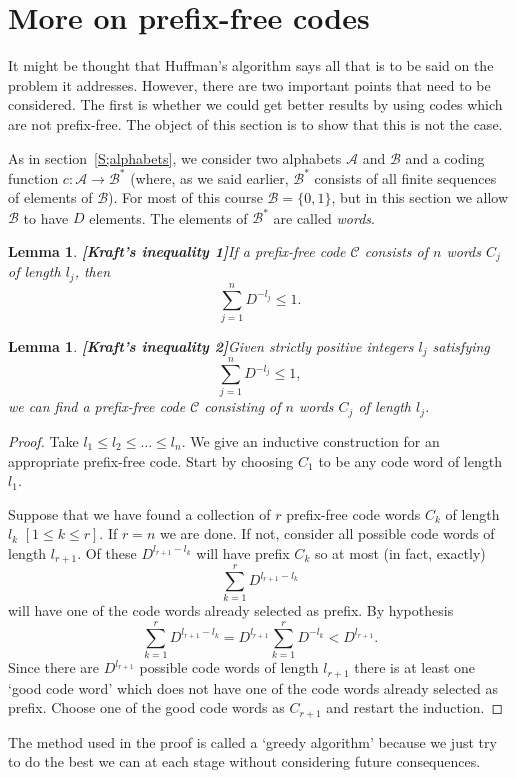 \documentclass[12pt,a4paper]{article}
\theoremstyle{plain}
\newtheorem{lemma}[theorem]{Lemma}
\theoremstyle{definition}
\begin{document}
\section{More on prefix-free codes}\label{S;prefix} 
It might be thought that
Huffman's algorithm says all that is to be said on
the problem it addresses. However, there are two important
points that need to be considered. The first is whether
we could get better results by using codes which
are not prefix-free. The object of this section is
to show that this is not the case.

As in section~\ref{S;alphabets},
we consider two alphabets ${\mathcal A}$
and ${\mathcal B}$ 
and a coding function $c:{\mathcal A}\rightarrow{\mathcal B}^{*}$
(where, as we said earlier, 
${\mathcal B}^{*}$ consists of all finite sequences of 
elements of  ${\mathcal B}$).  For most of this
course ${\mathcal B}=\{0,1\}$, but in this section
we allow ${\mathcal B}$ to have $D$ elements.
The elements of ${\mathcal B}^{*}$ are called \emph{words}.

\begin{lemma} {\bf [Kraft's inequality 1]}\label{Kraft 1}
If a prefix-free code ${\mathcal C}$ consists
of $n$ words $C_{j}$ of length $l_{j}$, then
\[\sum_{j=1}^{n}D^{-l_{j}}\leq 1.\]
\end{lemma}
\begin{lemma} {\bf [Kraft's inequality 2]}\label{L;Kraft 2}
Given strictly positive integers $l_{j}$ satisfying
\[\sum_{j=1}^{n}D^{-l_{j}}\leq 1,\]
we can find a prefix-free code ${\mathcal C}$ consisting
of $n$ words $C_{j}$ of length $l_{j}$.
\end{lemma}
\begin{proof} Take $l_{1}\leq l_{2}\leq\dots\leq l_{n}$.
We give an inductive construction for an appropriate
prefix-free code. Start by choosing $C_{1}$ to be
any  code word  of length $l_{1}$.

Suppose that we have found a collection of $r$ prefix-free
code words $C_{k}$ of length $l_{k}$ $[1\leq k\leq r]$.
If $r=n$ we are done. If not, consider all 
possible code words
of length $l_{r+1}$. Of these $D^{l_{r+1}-l_{k}}$ will
have prefix $C_{k}$ so at most (in fact, exactly)
\[\sum_{k=1}^{r}D^{l_{r+1}-l_{k}}\]
will have one of the code words already selected as prefix.
By hypothesis
\[\sum_{k=1}^{r}D^{l_{r+1}-l_{k}}
=D^{l_{r+1}}\sum_{k=1}^{r}D^{-l_{k}}<D^{l_{r+1}}.\]
Since there are $D^{l_{r+1}}$ possible code words of length 
$l_{r+1}$ there is at least one `good code word'
which does not
have one of the code words already selected as prefix.
Choose one of the good code words as $C_{r+1}$
and restart the induction.
\end{proof}
The method used in the proof is called a `greedy algorithm'
because we just try to do the best we can at each stage
without considering future consequences.
\end{document}
